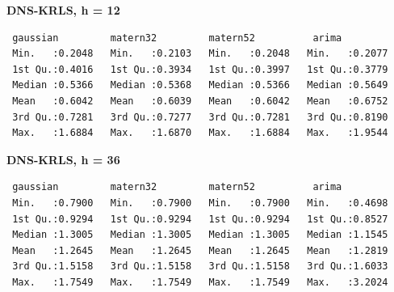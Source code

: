 \textbf{DNS-KRLS, h = 12}

\begin{verbatim}
 gaussian         matern32         matern52          arima       
 Min.   :0.2048   Min.   :0.2103   Min.   :0.2048   Min.   :0.2077  
 1st Qu.:0.4016   1st Qu.:0.3934   1st Qu.:0.3997   1st Qu.:0.3779  
 Median :0.5366   Median :0.5368   Median :0.5366   Median :0.5649  
 Mean   :0.6042   Mean   :0.6039   Mean   :0.6042   Mean   :0.6752  
 3rd Qu.:0.7281   3rd Qu.:0.7277   3rd Qu.:0.7281   3rd Qu.:0.8190  
 Max.   :1.6884   Max.   :1.6870   Max.   :1.6884   Max.   :1.9544 
\end{verbatim}

\textbf{DNS-KRLS, h = 36}

\begin{verbatim}
 gaussian         matern32         matern52          arima       
 Min.   :0.7900   Min.   :0.7900   Min.   :0.7900   Min.   :0.4698  
 1st Qu.:0.9294   1st Qu.:0.9294   1st Qu.:0.9294   1st Qu.:0.8527  
 Median :1.3005   Median :1.3005   Median :1.3005   Median :1.1545  
 Mean   :1.2645   Mean   :1.2645   Mean   :1.2645   Mean   :1.2819  
 3rd Qu.:1.5158   3rd Qu.:1.5158   3rd Qu.:1.5158   3rd Qu.:1.6033  
 Max.   :1.7549   Max.   :1.7549   Max.   :1.7549   Max.   :3.2024  
\end{verbatim}


